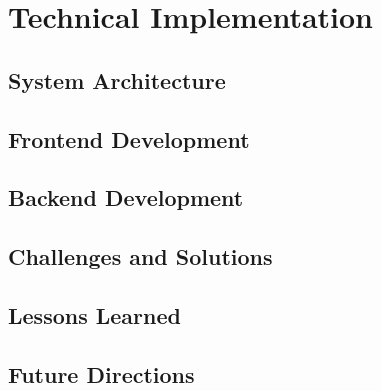 %
\chapter{Technical Implementation}
\label{sec:system}



\section{System Architecture}
\label{sec:system:architecture}


\section{Frontend Development} 
\label{sec:system:frontend}



\section{Backend Development}
\label{sec:system:backend}


\section{Challenges and Solutions}
\label{sec:system:challenges}


\section{Lessons Learned}
\label{sec:system:lessons}

\section{Future Directions}
\label{sec:system:future}
